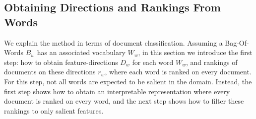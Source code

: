 


\subsection{Obtaining Directions and Rankings From Words}


We explain the method in terms of document classification.  Assuming a Bag-Of-Words $B_w $ has an associated vocabulary $W_w $, 
in this section we introduce the first step: how to obtain feature-directions $D_w $ for each word $W_w $, and rankings of documents  on these directions $r_w $, where each word is ranked on every document. For this step, not all words are expected to be salient in the domain. Instead, the first step shows how to obtain an interpretable representation where every document is ranked on every word, and the next step shows how to filter these rankings to only salient features.

